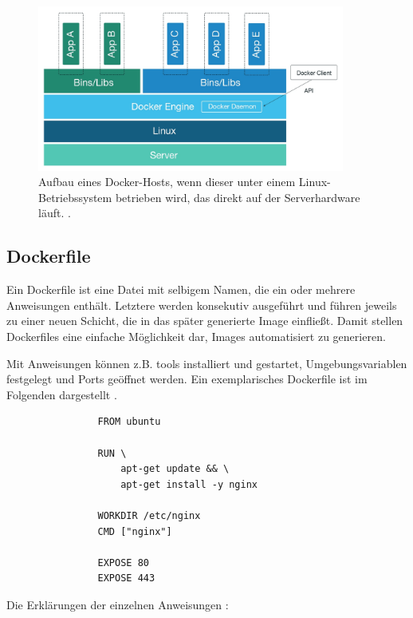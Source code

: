 \documentclass[../main.tex]{subfiles}
\begin{document}
      \begin{figure}[h]
          \centering
          \includegraphics[width=0.9\textwidth]{./images/intro_dockerHost.jpg}
          \caption{Aufbau eines Docker-Hosts, wenn dieser unter einem Linux-Betriebssystem betrieben wird, das direkt auf der Serverhardware läuft. \cite[S.3]{dockerSecIntro}.}
          \label{fig:intro_dockerHost}
      \end{figure}

		\subsection{Dockerfile}
		\label{dockerDockerfile}
      Ein Dockerfile ist eine Datei mit selbigem Namen, die ein oder mehrere Anweisungen enthält. Letztere werden konsekutiv ausgeführt und führen jeweils zu einer neuen Schicht, die in das später generierte Image einfließt. Damit stellen Dockerfiles eine einfache Möglichkeit dar, Images automatisiert zu generieren.

			Mit Anweisungen können z.B. tools installiert und gestartet, Umgebungsvariablen festgelegt und Ports geöffnet werden. Ein exemplarisches Dockerfile ist im Folgenden dargestellt \cite{githubDockerfileNginx}.

			\begin{lstlisting}
				FROM ubuntu

				RUN \
					apt-get update && \
					apt-get install -y nginx

				WORKDIR /etc/nginx
				CMD ["nginx"]

				EXPOSE 80
				EXPOSE 443
			\end{lstlisting}

			Die Erklärungen der einzelnen Anweisungen \cite{dockerDockerfileDocs}:
\end{document}
